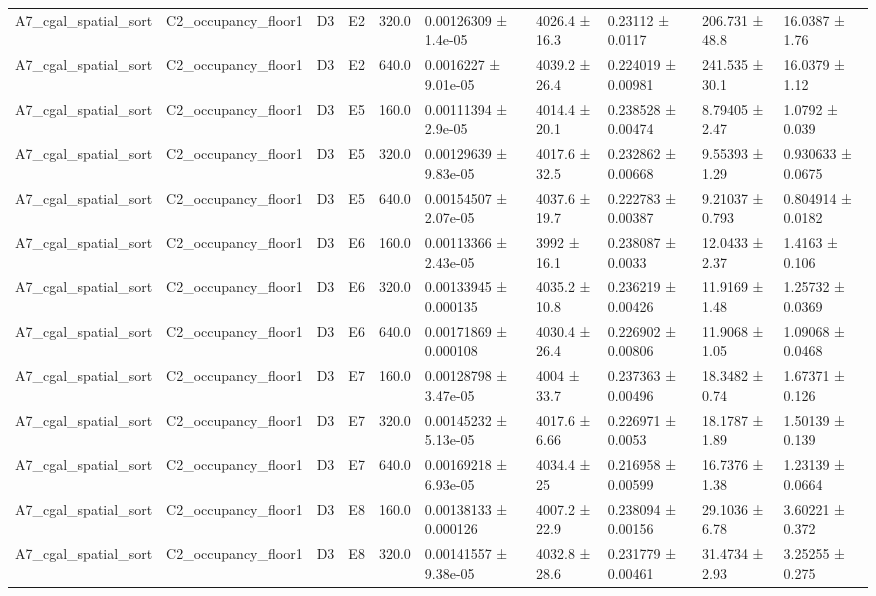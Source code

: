 \begin{table}
\begin{tabular}{llllllllll}
A7\_cgal\_spatial\_sort & C2\_occupancy\_floor1 & D3 & E2 & 320.0 & 0.00126309 ± 1.4e-05 & 4026.4 ± 16.3 & 0.23112 ± 0.0117 & 206.731 ± 48.8 & 16.0387 ± 1.76 \\
A7\_cgal\_spatial\_sort & C2\_occupancy\_floor1 & D3 & E2 & 640.0 & 0.0016227 ± 9.01e-05 & 4039.2 ± 26.4 & 0.224019 ± 0.00981 & 241.535 ± 30.1 & 16.0379 ± 1.12 \\
A7\_cgal\_spatial\_sort & C2\_occupancy\_floor1 & D3 & E5 & 160.0 & 0.00111394 ± 2.9e-05 & 4014.4 ± 20.1 & 0.238528 ± 0.00474 & 8.79405 ± 2.47 & 1.0792 ± 0.039 \\
A7\_cgal\_spatial\_sort & C2\_occupancy\_floor1 & D3 & E5 & 320.0 & 0.00129639 ± 9.83e-05 & 4017.6 ± 32.5 & 0.232862 ± 0.00668 & 9.55393 ± 1.29 & 0.930633 ± 0.0675 \\
A7\_cgal\_spatial\_sort & C2\_occupancy\_floor1 & D3 & E5 & 640.0 & 0.00154507 ± 2.07e-05 & 4037.6 ± 19.7 & 0.222783 ± 0.00387 & 9.21037 ± 0.793 & 0.804914 ± 0.0182 \\
A7\_cgal\_spatial\_sort & C2\_occupancy\_floor1 & D3 & E6 & 160.0 & 0.00113366 ± 2.43e-05 & 3992 ± 16.1 & 0.238087 ± 0.0033 & 12.0433 ± 2.37 & 1.4163 ± 0.106 \\
A7\_cgal\_spatial\_sort & C2\_occupancy\_floor1 & D3 & E6 & 320.0 & 0.00133945 ± 0.000135 & 4035.2 ± 10.8 & 0.236219 ± 0.00426 & 11.9169 ± 1.48 & 1.25732 ± 0.0369 \\
A7\_cgal\_spatial\_sort & C2\_occupancy\_floor1 & D3 & E6 & 640.0 & 0.00171869 ± 0.000108 & 4030.4 ± 26.4 & 0.226902 ± 0.00806 & 11.9068 ± 1.05 & 1.09068 ± 0.0468 \\
A7\_cgal\_spatial\_sort & C2\_occupancy\_floor1 & D3 & E7 & 160.0 & 0.00128798 ± 3.47e-05 & 4004 ± 33.7 & 0.237363 ± 0.00496 & 18.3482 ± 0.74 & 1.67371 ± 0.126 \\
A7\_cgal\_spatial\_sort & C2\_occupancy\_floor1 & D3 & E7 & 320.0 & 0.00145232 ± 5.13e-05 & 4017.6 ± 6.66 & 0.226971 ± 0.0053 & 18.1787 ± 1.89 & 1.50139 ± 0.139 \\
A7\_cgal\_spatial\_sort & C2\_occupancy\_floor1 & D3 & E7 & 640.0 & 0.00169218 ± 6.93e-05 & 4034.4 ± 25 & 0.216958 ± 0.00599 & 16.7376 ± 1.38 & 1.23139 ± 0.0664 \\
A7\_cgal\_spatial\_sort & C2\_occupancy\_floor1 & D3 & E8 & 160.0 & 0.00138133 ± 0.000126 & 4007.2 ± 22.9 & 0.238094 ± 0.00156 & 29.1036 ± 6.78 & 3.60221 ± 0.372 \\
A7\_cgal\_spatial\_sort & C2\_occupancy\_floor1 & D3 & E8 & 320.0 & 0.00141557 ± 9.38e-05 & 4032.8 ± 28.6 & 0.231779 ± 0.00461 & 31.4734 ± 2.93 & 3.25255 ± 0.275 \\

\end{tabular}
\end{table}
